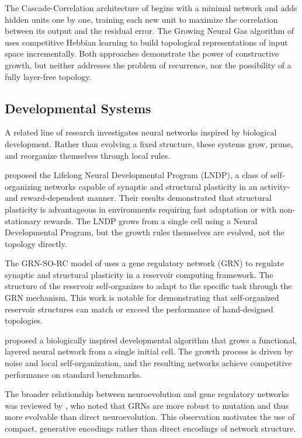 The Cascade-Correlation architecture of \citet{fahlman1990cascade}
begins with a minimal network and adds hidden units one by one, training
each new unit to maximize the correlation between its output and the
residual error. The Growing Neural Gas algorithm of
\citet{fritzke1995growing} uses competitive Hebbian learning to build
topological representations of input space incrementally. Both
approaches demonstrate the power of constructive growth, but neither
addresses the problem of recurrence, nor the possibility of a fully
layer-free topology.

\subsection{Developmental Systems}

A related line of research investigates neural networks inspired by
biological development. Rather than evolving a fixed structure, these
systems grow, prune, and reorganize themselves through local rules.

\citet{plantec2024evolving} proposed the Lifelong Neural Developmental
Program (LNDP), a class of self-organizing networks capable of synaptic
and structural plasticity in an activity- and reward-dependent manner.
Their results demonstrated that structural plasticity is advantageous in
environments requiring fast adaptation or with non-stationary rewards.
The LNDP grows from a single cell using a Neural Developmental Program,
but the growth rules themselves are evolved, not the topology directly.

The GRN-SO-RC model of \citet{hajizada2024developmental} uses a gene
regulatory network (GRN) to regulate synaptic and structural plasticity
in a reservoir computing framework. The structure of the reservoir
self-organizes to adapt to the specific task through the GRN mechanism.
This work is notable for demonstrating that self-organized reservoir
structures can match or exceed the performance of hand-designed
topologies.

\citet{hazan2024self} proposed a biologically inspired developmental
algorithm that grows a functional, layered neural network from a single
initial cell. The growth process is driven by noise and local
self-organization, and the resulting networks achieve competitive
performance on standard benchmarks.

The broader relationship between neuroevolution and gene regulatory
networks was reviewed by \citet{gerges2025neuroevolution}, who noted
that GRNs are more robust to mutation and thus more evolvable than direct
neuroevolution. This observation motivates the use of compact, generative
encodings rather than direct encodings of network structure.


